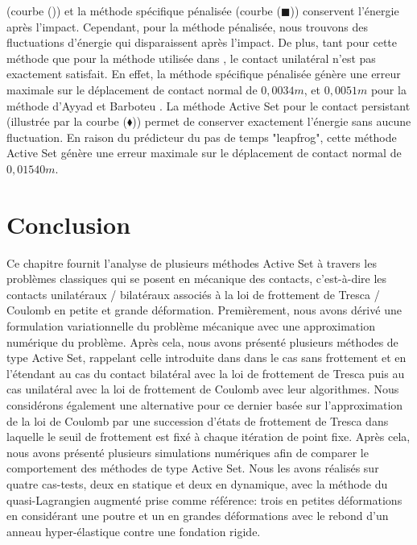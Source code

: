 (courbe ({\Large\textbullet})) et la méthode spécifique pénalisée (courbe ($\blacksquare$)) conservent l'énergie après l'impact. Cependant, pour la méthode pénalisée, nous trouvons des fluctuations d'énergie qui disparaissent après l'impact. De plus, tant pour cette méthode que pour la méthode utilisée dans \cite{ayyad2009formulation}
, le contact unilatéral n'est pas exactement satisfait. En effet, la méthode spécifique pénalisée génère une erreur maximale sur le déplacement de contact normal de $0,0034m$, et $0,0051m$ pour la méthode d'Ayyad et Barboteu \cite{ayyad2009formulation}. La méthode Active Set pour le contact persistant (illustrée par la courbe ($\blacklozenge$)) permet de conserver exactement l'énergie sans aucune fluctuation. En raison du prédicteur du pas de temps "leapfrog", cette méthode Active Set génère une erreur maximale sur le déplacement de contact normal de $0,01540 m$.\\

\vspace{1.5cm}

\section*{Conclusion}

Ce chapitre fournit l'analyse de plusieurs méthodes Active Set à travers les problèmes classiques qui se posent en mécanique des contacts, c'est-à-dire les contacts unilatéraux / bilatéraux associés à la loi de frottement de Tresca / Coulomb en petite et grande déformation. Premièrement, nous avons dérivé une formulation variationnelle du problème mécanique avec une approximation numérique du problème. Après cela, nous avons présenté plusieurs méthodes de type Active Set, rappelant celle introduite dans \cite{abide2016analysis} dans le cas sans frottement et en l'étendant au cas du contact bilatéral avec la loi de frottement de Tresca puis au cas unilatéral avec la loi de frottement de Coulomb avec leur algorithmes. Nous considérons également une alternative pour ce dernier basée sur l'approximation de la loi de Coulomb par une succession d'états de frottement de Tresca dans laquelle le seuil de frottement est fixé à chaque itération de point fixe. Après cela, nous avons présenté plusieurs simulations numériques afin de comparer le comportement des méthodes de type Active Set. Nous les avons réalisés sur quatre cas-tests, deux en statique et deux en dynamique, avec la méthode du quasi-Lagrangien augmenté prise comme référence: trois en petites déformations en considérant une poutre et un en grandes déformations avec le rebond d'un anneau hyper-élastique contre une fondation rigide.\\

